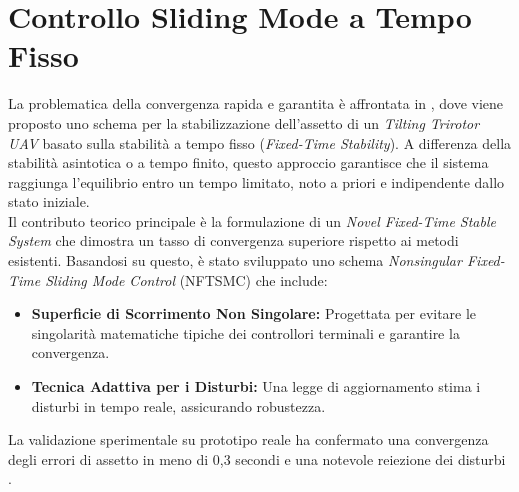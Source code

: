 \section{Controllo Sliding Mode a Tempo Fisso}
La problematica della convergenza rapida e garantita è affrontata in \cite{yu2022}, dove viene proposto uno schema per la stabilizzazione dell'assetto di un \textit{Tilting Trirotor UAV} basato sulla stabilità a tempo fisso (\textit{Fixed-Time Stability}). A differenza della stabilità asintotica o a tempo finito, questo approccio garantisce che il sistema raggiunga l'equilibrio entro un tempo limitato, noto a priori e indipendente dallo stato iniziale.
\\Il contributo teorico principale è la formulazione di un \textit{Novel Fixed-Time Stable System} che dimostra un tasso di convergenza superiore rispetto ai metodi esistenti. Basandosi su questo, è stato sviluppato uno schema \textit{Nonsingular Fixed-Time Sliding Mode Control} (NFTSMC) che include:
\begin{itemize}
    \item \textbf{Superficie di Scorrimento Non Singolare:} Progettata per evitare le singolarità matematiche tipiche dei controllori terminali e garantire la convergenza.
    \item \textbf{Tecnica Adattiva per i Disturbi:} Una legge di aggiornamento stima i disturbi in tempo reale, assicurando robustezza.
\end{itemize}
La validazione sperimentale su prototipo reale ha confermato una convergenza degli errori di assetto in meno di 0,3 secondi e una notevole reiezione dei disturbi \cite{yu2022}.

\clearpage
